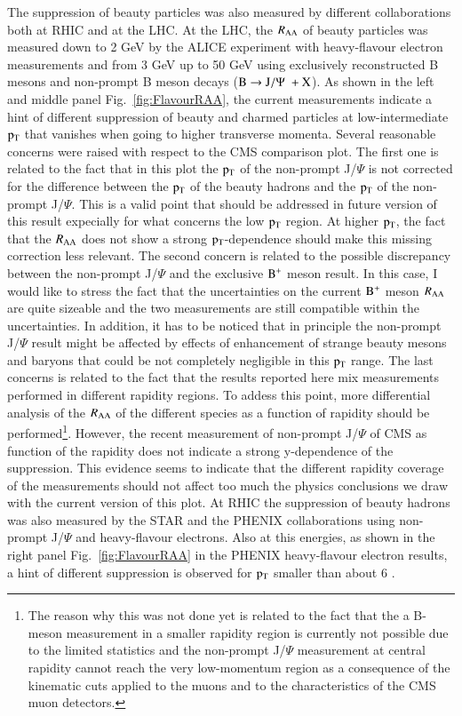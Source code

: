 \documentclass{webofc}
\begin{document}
The suppression of beauty particles was also measured by different collaborations both at RHIC and at the LHC. At the LHC, the $R_{\mathrm{AA}}$ of beauty 
particles was measured down to 2 GeV by the ALICE experiment with heavy-flavour electron measurements and from 3 GeV up to 50 GeV 
using exclusively reconstructed B mesons and non-prompt B meson decays ($\rm B \rightarrow J/\Psi \hspace{0.1cm}+ X$). As shown in the left and middle panel Fig.~\ref{fig:FlavourRAA}, 
the current measurements indicate a hint of different suppression of beauty and charmed particles at low-intermediate $\rm p_{\rm T} $ that vanishes when 
going to higher transverse momenta. Several reasonable concerns were raised with respect to the CMS comparison plot. 
The first one is related to the fact that in this plot the $\rm p_{\rm T} $ of the non-prompt J/$\Psi$ is not corrected for the difference between the $\rm p_{\rm T} $ of the beauty 
hadrons and the $\rm p_{\rm T} $ of the non-prompt J/$\Psi$. This is a valid point that should be addressed in future version of this result expecially for 
what concerns the low $\rm p_{\rm T} $ region. At higher $\rm p_{\rm T} $, the fact that the $R_{\mathrm{AA}}$ does not show a strong $\rm p_{\rm T} $-dependence should make this 
missing correction less relevant. The second concern is related to the possible discrepancy between the non-prompt J/$\Psi$  and the exclusive $\rm B^{+}$ meson result. 
In this case, I would like to stress the fact that the uncertainties on the current $\rm B^{+}$ meson $R_{\mathrm{AA}}$ are quite sizeable and the two measurements are still compatible 
within the uncertainties. In addition, it has to be noticed that in principle the non-prompt J/$\Psi$ result might be affected by effects of enhancement of strange beauty mesons 
and baryons that could be not completely negligible in this $\rm p_{\rm T} $ range. The last concerns is related to the fact that the results reported here mix measurements 
performed in different rapidity regions. To addess this point, more differential analysis of the $R_{\mathrm{AA}}$ of the different species as a function of rapidity 
should be performed\footnote{The reason why this was not done yet
is related to the fact that the a B-meson measurement in a smaller rapidity region is currently not possible due to the limited statistics and the non-prompt J/$\Psi$ measurement at central rapidity cannot 
reach the very low-momentum region as a consequence of the kinematic cuts applied to the muons and to the characteristics of the CMS muon detectors.}. 
However, the recent measurement of non-prompt J/$\Psi$ of CMS as function of the rapidity does not indicate a strong y-dependence of the suppression. This evidence
seems to indicate that the different rapidity coverage of the measurements should not affect too much the physics conclusions we draw with the current version of this plot. 
At RHIC the suppression of beauty hadrons was also measured by the STAR and the PHENIX collaborations using non-prompt J/$\Psi$  and heavy-flavour electrons. Also at this energies, 
as shown in the right panel Fig.~\ref{fig:FlavourRAA} in the PHENIX heavy-flavour electron results, a hint of different suppression is observed for $\rm p_{\rm T} $ smaller than about 6 \GeVc.
\end{document}
